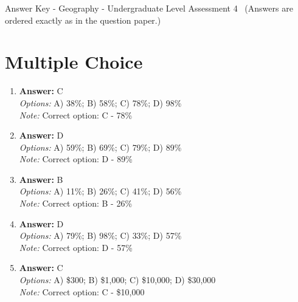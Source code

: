 \documentclass[12pt]{article}
\begin{document}
\begin{center}
Answer Key - Geography - Undergraduate Level Assessment 4 \
\small (Answers are ordered exactly as in the question paper.)
\end{center}

\section*{Multiple Choice}
\begin{enumerate}[label=\arabic*.]
\item \textbf{Answer:} C
\\ \textit{Options:} A) 38\%; B) 58\%; C) 78\%; D) 98\%
\\ \textit{Note:} Correct option: C - 78\%
\item \textbf{Answer:} D
\\ \textit{Options:} A) 59\%; B) 69\%; C) 79\%; D) 89\%
\\ \textit{Note:} Correct option: D - 89\%
\item \textbf{Answer:} B
\\ \textit{Options:} A) 11\%; B) 26\%; C) 41\%; D) 56\%
\\ \textit{Note:} Correct option: B - 26\%
\item \textbf{Answer:} D
\\ \textit{Options:} A) 79\%; B) 98\%; C) 33\%; D) 57\%
\\ \textit{Note:} Correct option: D - 57\%
\item \textbf{Answer:} C
\\ \textit{Options:} A) \$300; B) \$1,000; C) \$10,000; D) \$30,000
\\ \textit{Note:} Correct option: C - \$10,000
\end{enumerate}
\end{document}
